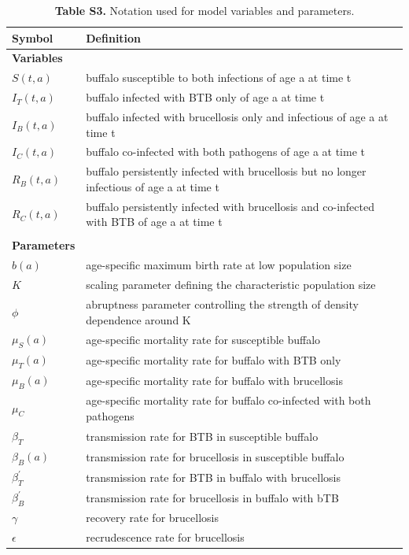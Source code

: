 \documentclass[10pt,letterpaper]{article}
\begin{document}
\begin{table} %
\caption*{\textbf{Table S3.} Notation used for model variables and parameters.}
\newcommand{\head}[1]{\textnormal{\textbf{#1}}}
\small
\begin{tabular}{ll} %
\hline
\head{Symbol} & \head{Definition}\\
\hline
\textbf{Variables} &   \\
$S(t, a)$ & buffalo susceptible to both infections of age a at time t  \\
$I_T(t, a)$ & buffalo infected with BTB only of age a at time t  \\
$I_B(t, a)$ & buffalo infected with brucellosis only and infectious of age a at time t \\
$I_C(t, a)$ & buffalo co-infected with both pathogens of age a at time t  \\
$R_B(t, a)$ & buffalo persistently infected with brucellosis but no longer infectious of age a at time t  \\
$R_C(t, a)$ & buffalo persistently infected with brucellosis and co-infected with BTB of age a at time t \\
& \\
\textbf{Parameters} &   \\
$b(a)$ & age-specific maximum birth rate at low population size\\
$K $& scaling parameter defining the characteristic population size \\
$\phi $& abruptness parameter controlling the strength of density dependence around K \\ 
$\mu_S(a) $& age-specific mortality rate for susceptible buffalo \\ 
$\mu_T(a) $& age-specific mortality rate for buffalo with BTB only \\ 
$\mu_B(a) $& age-specific mortality rate for buffalo with brucellosis \\ 
$\mu_C$ &age-specific mortality rate for buffalo co-infected with both pathogens \\ 
$\beta_T $ & transmission rate for BTB in susceptible buffalo \\
$\beta_B(a)$ & transmission rate for brucellosis in susceptible buffalo \\
$\beta_{T}^{'}$  & transmission rate for BTB in buffalo with brucellosis \\
$\beta_{B}^{'}$  & transmission rate for brucellosis in buffalo with bTB \\
$\gamma$& recovery rate for brucellosis \\
$\epsilon$& recrudescence rate for brucellosis \\
\hline 
\end{tabular}
\end{table}
\end{document}
